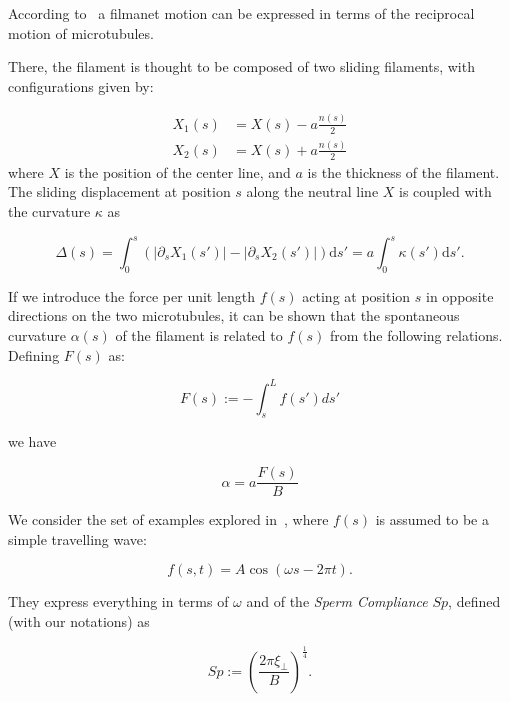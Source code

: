 \documentclass[12pt]{article}
\renewcommand{\d}{\mathrm{d}}
\begin{document}
According to~\cite{CamaletJulicher2000} a filmanet motion can be expressed in terms of the reciprocal motion of microtubules.

There, the filament is thought to be composed of two sliding filaments, with configurations given by:

$$
\begin{aligned}
X_1(s) &= X(s)-a\frac{n(s)}{2} \\
X_2(s) &= X(s)+a\frac{n(s)}{2} 
\end{aligned}
$$
%
where $X$ is the position of the center line, and $a$ is the thickness of the filament. 
The sliding displacement at position $s$ along the neutral line $X$ is coupled with the curvature $\kappa$ as

$$
\Delta(s) = \int_0^s\left(|\partial_s X_1(s')|-|\partial_s
  X_2(s')|\right) \d s' = a\int_0^s \kappa(s') \d s'.
$$

If we introduce the force per unit length $f(s)$ acting at position
$s$ in opposite directions on the two microtubules, it can be shown
that the spontaneous curvature $\alpha(s)$ of the filament is related
to $f(s)$ from the following relations. Defining $F(s)$ as:

$$
F(s) := -\int_s^L f(s') ds'
$$

we have

$$
\alpha = a \frac{F(s)}{B}
$$

We consider the set of examples explored in~\cite{Gadelha2010}, where
$f(s)$ is assumed to be a simple travelling wave:

$$
f(s,t) = A \cos(\omega s - 2\pi t).
$$

They express everything in terms of $\omega$ and of the \emph{Sperm
  Compliance} $Sp$, defined (with our notations) as

$$
Sp := \left(\frac{2\pi \xi_\perp}{B}\right)^{\frac{1}{4}}.
$$
\end{document}
